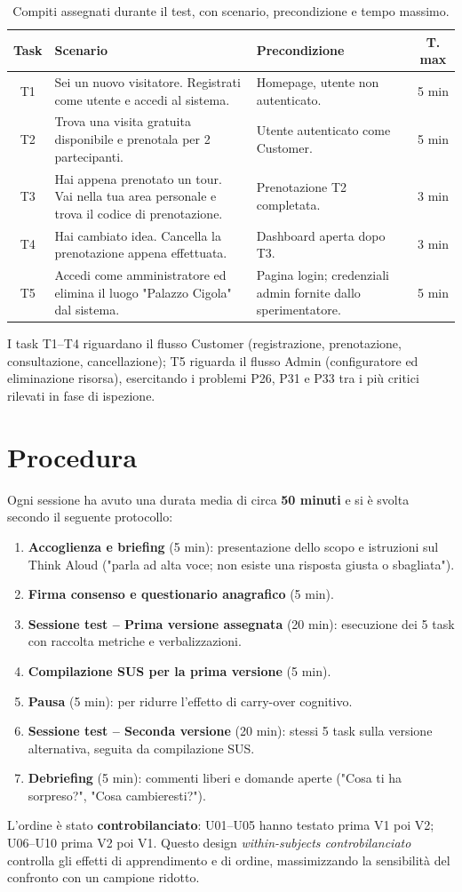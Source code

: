 \begin{table}[H]
\centering
\renewcommand{\arraystretch}{1.5}
\small
\begin{tabular}{|c|p{4.5cm}|p{4.5cm}|c|}
\hline
\textbf{Task} & \textbf{Scenario} & \textbf{Precondizione} & \textbf{T. max} \\
\hline
T1 & Sei un nuovo visitatore. Registrati come utente e accedi al sistema. & Homepage, utente non autenticato. & 5 min \\ \hline
T2 & Trova una visita gratuita disponibile e prenotala per 2 partecipanti. & Utente autenticato come Customer. & 5 min \\ \hline
T3 & Hai appena prenotato un tour. Vai nella tua area personale e trova il codice di prenotazione. & Prenotazione T2 completata. & 3 min \\ \hline
T4 & Hai cambiato idea. Cancella la prenotazione appena effettuata. & Dashboard aperta dopo T3. & 3 min \\ \hline
T5 & Accedi come amministratore ed elimina il luogo "Palazzo Cigola" dal sistema. & Pagina login; credenziali admin fornite dallo sperimentatore. & 5 min \\ \hline
\end{tabular}
\caption{Compiti assegnati durante il test, con scenario, precondizione e tempo massimo.}
\label{tab:task}
\end{table}

I task T1--T4 riguardano il flusso Customer (registrazione, prenotazione, consultazione, cancellazione); T5 riguarda il flusso Admin (configuratore ed eliminazione risorsa), esercitando i problemi P26, P31 e P33 tra i più critici rilevati in fase di ispezione.

\section{Procedura}

Ogni sessione ha avuto una durata media di circa \textbf{50 minuti} e si è svolta secondo il seguente protocollo:

\begin{enumerate}
    \item \textbf{Accoglienza e briefing} (5 min): presentazione dello scopo e istruzioni sul Think Aloud ("parla ad alta voce; non esiste una risposta giusta o sbagliata").
    \item \textbf{Firma consenso e questionario anagrafico} (5 min).
    \item \textbf{Sessione test -- Prima versione assegnata} (20 min): esecuzione dei 5 task con raccolta metriche e verbalizzazioni.
    \item \textbf{Compilazione SUS per la prima versione} (5 min).
    \item \textbf{Pausa} (5 min): per ridurre l'effetto di carry-over cognitivo.
    \item \textbf{Sessione test -- Seconda versione} (20 min): stessi 5 task sulla versione alternativa, seguita da compilazione SUS.
    \item \textbf{Debriefing} (5 min): commenti liberi e domande aperte ("Cosa ti ha sorpreso?", "Cosa cambieresti?").
\end{enumerate}

L'ordine è stato \textbf{controbilanciato}: U01--U05 hanno testato prima V1 poi V2; U06--U10 prima V2 poi V1. Questo design \textit{within-subjects controbilanciato} controlla gli effetti di apprendimento e di ordine, massimizzando la sensibilità del confronto con un campione ridotto.
